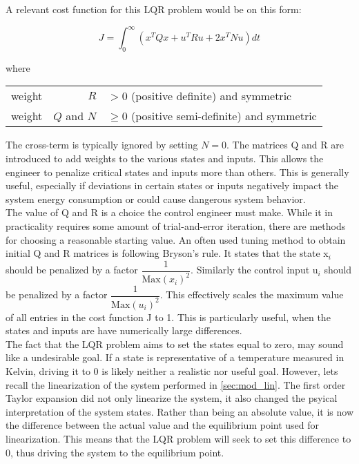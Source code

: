 A relevant cost function for this LQR problem would be on this form:

\begin{equation} \label{eq:lqr_cost_fcn}
	J = \int_0^{\infty} \left(x^TQx + u^TRu + 2x^TNu\right)dt
\end{equation}

where

\begin{center}
	\begin{tabular}{l r l }
		weight & $R$         & $ > 0$ (positive definite) and symmetric       \\
		weight & $Q$ and $N$ & $\ge 0$ (positive semi-definite) and symmetric
	\end{tabular}
\end{center}

The cross-term is typically ignored by setting $N=0$. The matrices Q and R are introduced to add weights to the various states and inputs. This allows the engineer to penalize critical states and inputs more than others. This is generally useful, especially if deviations in certain states or inputs negatively impact the system energy consumption or could cause dangerous system behavior.\\

The value of Q and R is a choice the control engineer must make. While it in practicality requires some amount of trial-and-error iteration, there are methods for choosing a reasonable starting value. An often used tuning method to obtain initial Q and R matrices is following Bryson's rule. It states that the state x$_{\textit{i}}$ should be penalized by a factor $\dfrac{1}{\text{Max} \left(x_{\textit{i}}\right)^2}$. Similarly the control input u$_{\textit{i}}$ should be penalized by a factor $\dfrac{1}{\text{Max} \left(u_{\textit{i}}\right)^2}$. This effectively scales the maximum value of all entries in the cost function J to 1. This is particularly useful, when the states and inputs are have numerically large differences.\\


The fact that the LQR problem aims to set the states equal to zero, may sound like a undesirable goal. If a state is representative of a temperature measured in Kelvin, driving it to 0 is likely neither a realistic nor useful goal. However, lets recall the linearization of the system performed in \cref{sec:mod_lin}. The first order Taylor expansion did not only linearize the system, it also changed the psyical interpretation of the system states. Rather than being an absolute value, it is now the difference between the actual value and the equilibrium point used for linearization. This means that the LQR problem will seek to set this difference to 0, thus driving the system to the equilibrium point.\\

